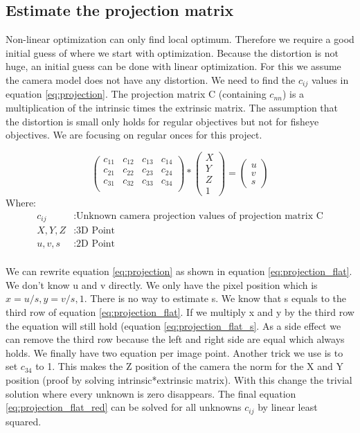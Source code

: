 \documentclass[11pt,a4paper,titlepage,oneside]{report}
\begin{document}
\subsection{Estimate the projection matrix}\label{sec:est_proj}
Non-linear optimization can only find local optimum. Therefore we require a good initial guess of where we start with optimization. Because the distortion is not huge, an initial guess can be done with linear optimization. For this we assume the camera model does not have any distortion. We need to find the $c_{ij}$ values in equation \ref{eq:projection}. The projection matrix C (containing $c_{nn}$) is a multiplication of the intrinsic times the extrinsic matrix. The assumption that the distortion is small only holds for regular objectives but not for fisheye objectives. We are focusing on regular onces for this project.

\begin{equation}\label{eq:projection}
	\begin{pmatrix}c_{11} & c_{12} & c_{13} & c_{14}\\
		c_{21} & c_{22} & c_{23} & c_{24}\\
		c_{31} & c_{32} & c_{33} & c_{34}\\
	\end{pmatrix}*
	\begin{pmatrix}
		X \\
		Y \\
		Z \\
		1
	\end{pmatrix}=
	\begin{pmatrix}
		u \\
		v \\
		s
  \end{pmatrix}
\end{equation}
Where:
\begin{align*}
	c_{ij}		&: \text{Unknown camera projection values of projection matrix C}\\
	X,Y,Z			&: \text{3D Point}\\
	u,v,s			&: \text{2D Point}\\
\end{align*}

We can rewrite equation \ref{eq:projection} as shown in equation \ref{eq:projection_flat}. We don't know u and v directly. We only have the pixel position which is $x=u/s, y=v/s, 1$. There is no way to estimate s. We know that s equals to the third row of equation \ref{eq:projection_flat}. If we multiply x and y by the third row the equation will still hold (equation \ref{eq:projection_flat_s}. As a side effect we can remove the third row because the left and right side are equal which always holds. We finally have two equation per image point. Another trick we use is to set $c_{34}$ to 1. This makes the Z position of the camera the norm for the X and Y position (proof by solving intrinsic*extrinsic matrix). With this change the trivial solution where every unknown is zero disappears. The final equation \ref{eq:projection_flat_red} can be solved for all unknowns $c_{ij}$ by linear least squared.
\end{document}
